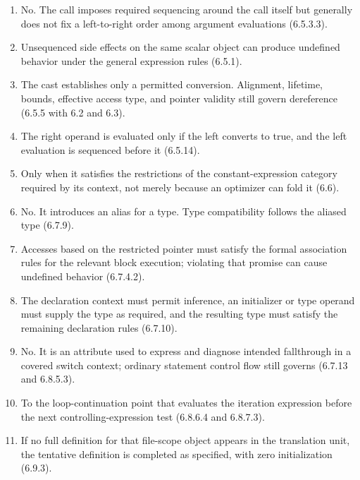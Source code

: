 \documentclass[10pt,letterpaper]{article}
\begin{document}
\begin{enumerate}
  \item No. The call imposes required sequencing around the call itself but generally does not fix a left-to-right order among argument evaluations (6.5.3.3).

  \item Unsequenced side effects on the same scalar object can produce undefined behavior under the general expression rules (6.5.1).

  \item The cast establishes only a permitted conversion. Alignment, lifetime, bounds, effective access type, and pointer validity still govern dereference (6.5.5 with 6.2 and 6.3).

  \item The right operand is evaluated only if the left converts to true, and the left evaluation is sequenced before it (6.5.14).

  \item Only when it satisfies the restrictions of the constant-expression category required by its context, not merely because an optimizer can fold it (6.6).

  \item No. It introduces an alias for a type. Type compatibility follows the aliased type (6.7.9).

  \item Accesses based on the restricted pointer must satisfy the formal association rules for the relevant block execution; violating that promise can cause undefined behavior (6.7.4.2).

  \item The declaration context must permit inference, an initializer or type operand must supply the type as required, and the resulting type must satisfy the remaining declaration rules (6.7.10).

  \item No. It is an attribute used to express and diagnose intended fallthrough in a covered switch context; ordinary statement control flow still governs (6.7.13 and 6.8.5.3).

  \item To the loop-continuation point that evaluates the iteration expression before the next controlling-expression test (6.8.6.4 and 6.8.7.3).

  \item If no full definition for that file-scope object appears in the translation unit, the tentative definition is completed as specified, with zero initialization (6.9.3).


\end{enumerate}
\end{document}
